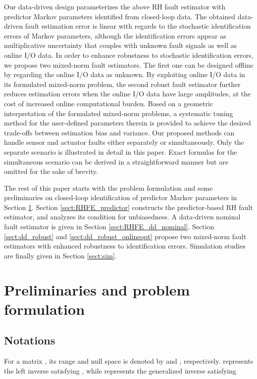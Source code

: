 \documentclass[twocolumn]{autart}
\begin{document}
Our data-driven design parameterizes the above RH fault estimator with predictor Markov parameters identified from closed-loop data. The obtained data-driven fault estimation error is linear with regards to the stochastic identification errors of Markov parameters, although the identification errors appear as multiplicative uncertainty that couples with unknown fault signals as well as online I/O data. In order to enhance robustness to  stochastic identification errors, we propose two mixed-norm fault estimators.
The first one can be designed offline by regarding the online I/O data as unknown. By exploiting online I/O data in its formulated mixed-norm problem, the second robust fault estimator further reduces estimation errors when the online I/O data have large amplitudes, at the cost of increased online computational burden.  Based on a geometric interpretation of the formulated mixed-norm problems, a systematic tuning method for the user-defined parameters therein is provided to achieve the desired trade-offs between estimation bias and variance. 
Our proposed methods can handle sensor and actuator faults either separately or simultaneously. Only the separate scenario is illustrated in detail in this paper. Exact formulas for the simultaneous scenario can be derived in a straightforward manner but are omitted for the sake of brevity.


The rest of this paper starts with the problem formulation and some preliminaries on closed-loop identification of predictor Markov parameters in Section \ref{sect:probformulation}. Section \ref{sect:RHFE_predictor} constructs the predictor-based RH fault estimator, and analyzes its condition for unbiasedness. A data-driven nominal fault estimator is given in Section \ref{sect:RHFE_dd_nominal}. Section \ref{sect:dd_robust} and \ref{sect:dd_robust_onlineopt} propose two mixed-norm fault estimators with enhanced robustness to identification errors. Simulation studies are finally given in Section \ref{sect:sim}.

\section{Preliminaries and problem formulation}\label{sect:probformulation}

\subsection{Notations}
For a matrix , its range and null space is denoted by  and , respectively.  represents the left inverse satisfying , while  represents the generalized inverse satisfying
\end{document}
